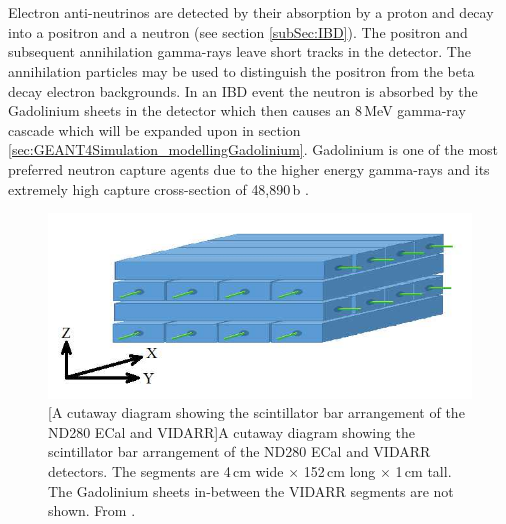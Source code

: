 \\\\Electron anti-neutrinos  are detected by their absorption by a proton and decay into a positron and a neutron (see section \ref{subSec:IBD}). The positron and subsequent annihilation gamma-rays leave short tracks in the detector. The annihilation particles may be used to distinguish the positron from the beta decay electron backgrounds. In an IBD event the neutron is absorbed by the Gadolinium sheets in the detector which then causes an 8\,MeV gamma-ray cascade which will be expanded upon in section \ref{sec:GEANT4Simulation_modellingGadolinium}. Gadolinium is one of the most preferred neutron capture agents due to the higher energy gamma-rays and its extremely high capture cross-section of 48,890\,b \cite{Abdushukurov_2010}. 

\begin{figure}[!h]
\centering
  \centering
  \includegraphics[width=0.6\linewidth]{Chapter2/Figs/Raster/VIDARR_diagram.jpeg}
  [A cutaway diagram showing the scintillator bar arrangement of the ND280 ECal and VIDARR]{A cutaway diagram showing the scintillator bar arrangement of the ND280 ECal and VIDARR detectors. The segments are 4\,cm wide $\times$ 152\,cm long $\times$ 1\,cm tall. The Gadolinium sheets in-between the VIDARR segments are not shown. From \cite{GeorgeHoltDiagram}.}
  \label{fig:vidarrDiagram}
\end{figure}


